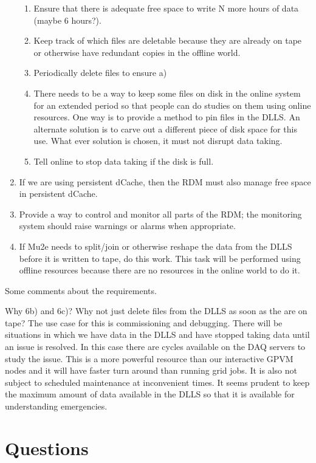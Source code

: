 \begin{enumerate}
  \begin{enumerate}
   \item Ensure that there is adequate free space to write N more hours of data (maybe 6 hours?).
   \item Keep track of which files are deletable because they are already on tape or otherwise have redundant copies in the offline world.
   \item Periodically delete files to ensure a)
   \item There needs to be a way to keep some files on disk in the online system for an extended period so that
     people can do studies on them using online resources. One way is to provide
     a method to pin files in the DLLS.  An alternate solution is to carve out a different piece of disk
     space for this use.
     What ever solution is chosen, it must not disrupt data taking.
   \item Tell online to stop data taking if the disk is full.
  \end{enumerate}
\item If we are using persistent dCache, then the RDM must also manage free space in persistent dCache.
\item Provide a way to control and monitor all parts of the RDM; the monitoring system should raise warnings or alarms when appropriate.
\item If Mu2e needs to split/join or otherwise reshape the data from the DLLS before it is written to tape, do this work.
  This task will be performed using offline resources because there are no resources in the online world to do it.
\end{enumerate}

Some comments about the requirements.

Why 6b) and 6c)?
Why not just delete files from the DLLS as soon as the are on tape?
The use case for this is commissioning and debugging.
There will be situations in which we have data in the DLLS and have stopped taking data
until an issue is resolved.
In this case there are cycles available on the DAQ servers to study the issue.
This is a more powerful resource than our interactive GPVM nodes and
it will have faster turn around than running grid jobs.
It is also not subject to scheduled maintenance at inconvenient times.
It seems prudent to keep the maximum amount of data available in the DLLS so that
it is available for understanding emergencies.


\chapter{Questions}

